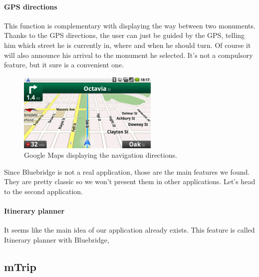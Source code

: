 \paragraph{GPS directions} This function is complementary with displaying the way between two monuments. Thanks to the GPS directions, the user can just be guided by the GPS, telling him which street he is currently in, where and when he should turn. Of course it will also announce his arrival to the monument he selected. It's not a compulsory feature, but it sure is a convenient one.
\begin{figure}[h!]
	\centering
	\includegraphics[width=0.6\textwidth]{input/directions.png}
	\caption{Google Maps displaying the navigation directions.}
	\label{fig:directions}
\end{figure}
Since Bluebridge is not a real application, those are the main features we found. They are pretty classic so we won't present them in other applications. Let's head to the second application.

\paragraph{Itinerary planner} It seems like the main idea of our application already exists. This feature is called Itinerary planner with Bluebridge, 

\subsection{mTrip}
